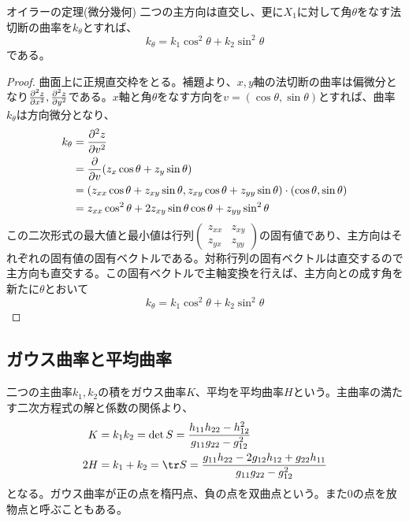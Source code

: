         \begin{thm}{オイラーの定理(微分幾何)}
            二つの主方向は直交し、更に$X_1$に対して角$\theta$をなす法切断の曲率を$k_\theta$とすれば、
                \[k_\theta = k_1\cos^2\theta + k_2\sin^2\theta\]
            である。
        \end{thm}
        \begin{proof}
            曲面上に正規直交枠をとる。補題より、$x,y$軸の法切断の曲率は偏微分となり$\pd[^2z]{x^2},\pd[^2z]{y^2}$である。$x$軸と角$\theta$をなす方向を$v = (\cos\theta, \sin\theta)$とすれば、曲率$k_\theta$は方向微分となり、
            \begin{align*}
                k_\theta &= \pd[^2z]{v^2}\\
                &= \pd{v}(z_x\cos\theta + z_y\sin\theta)\\
                &= (z_{xx}\cos\theta + z_{xy}\sin\theta, z_{xy}\cos\theta + z_{yy}\sin\theta) \cdot (\cos\theta, \sin\theta)\\
                &= z_{xx}\cos^2\theta + 2z_{xy}\sin\theta\cos\theta + z_{yy}\sin^2\theta
            \end{align*}
            この二次形式の最大値と最小値は行列$\begin{pmatrix}z_{xx} & z_{xy}\\ z_{yx} & z_{yy}\end{pmatrix}$の固有値であり、主方向はそれぞれの固有値の固有ベクトルである。対称行列の固有ベクトルは直交するので主方向も直交する。この固有ベクトルで主軸変換を行えば、主方向との成す角を新たに$\theta$とおいて
                \[k_\theta = k_1\cos^2\theta + k_2\sin^2\theta\]
        \end{proof}

    \subsection{ガウス曲率と平均曲率}
        二つの主曲率$k_1,k_2$の積をガウス曲率$K$、平均を平均曲率$H$という。主曲率の満たす二次方程式の解と係数の関係より、
        \begin{align*}
            K &= k_1k_2 = \det S = \frac{h_{11}h_{22} - h_{12}^2}{g_{11}g_{22} - g_{12}^2}\\
            2H &= k_1 + k_2 = \tr S = \frac{g_{11}h_{22} - 2g_{12}h_{12} + g_{22}h_{11}}{g_{11}g_{22} - g_{12}^2}\\
        \end{align*}
        となる。ガウス曲率が正の点を楕円点、負の点を双曲点という。また0の点を放物点と呼ぶこともある。

